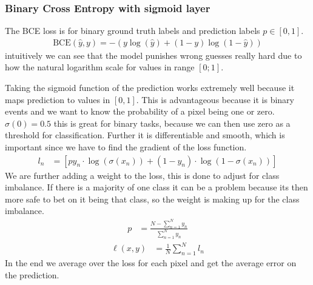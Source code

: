 \documentclass[a4paper,12pt]{article}
\begin{document}


\subsubsection{Binary Cross Entropy with sigmoid layer}
The BCE loss is for binary ground truth labels and prediction labels $p \in [0,1]$.
\begin{align}
  \text{BCE}(\hat{y}, y) = - \left( y \log(\hat{y}) + (1 - y) \log(1 - \hat{y}) \right)
\end{align}
intuitively we can see that the model punishes wrong guesses really hard due to how the natural logarithm scale for values in range $[0;1]$.

Taking the sigmoid function of the prediction works extremely well because it maps prediction to values in $[0,1]$. This is advantageous because it is binary events and we want to know the probability of a pixel being one or zero. $\sigma(0)=0.5$ this is great for binary tasks, because we can then use zero as a threshold for classification. Further it is differentiable and smooth, which is important since we have to find the gradient of the loss function.
\begin{align}
  l_{n}&=\left[p y_{n} \cdot \log (\sigma\left(x_{n}\right))+\left(1-y_{n}\right) \cdot \log \left(1-\sigma\left(x_{n}\right)\right)\right]
\end{align}
We are further adding a weight to the loss, this is done to adjust for class imbalance. If there is a majority of one class it can be a problem because its then more safe to bet on it being that class, so the weight is making up for the class imbalance.
\begin{align}
  p &= \frac{N-\sum^{N}_{n=1} y_n }{\sum^{N}_{n=1} y_n}
\end{align}
\begin{align}
  \ell(x, y)&=\frac{1}{N} \sum^{N}_{n=1} l_{n}
\end{align}
In the end we average over the loss for each pixel and get the average error on the prediction.
\end{document}

